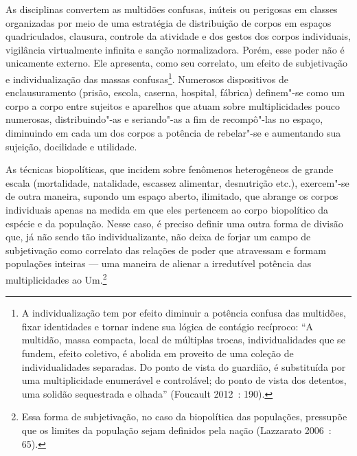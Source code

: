 As disciplinas convertem as multidões confusas, inúteis ou perigosas em
classes organizadas por meio de uma estratégia de distribuição de corpos
em espaços quadriculados, clausura, controle da atividade e dos gestos
dos corpos individuais, vigilância virtualmente infinita e sanção
normalizadora. Porém, esse poder não é unicamente externo. Ele
apresenta, como seu correlato, um efeito de subjetivação e
individualização das massas confusas\footnote{A
  individualização tem por efeito diminuir a potência confusa das
  multidões, fixar identidades e tornar indene sua lógica de contágio
  recíproco: ``A multidão, massa compacta, local de múltiplas trocas,
  individualidades que se fundem, efeito coletivo, é abolida em proveito
  de uma coleção de individualidades separadas. Do ponto de vista do
  guardião, é substituída por uma multiplicidade enumerável e
  controlável; do ponto de vista dos detentos, uma solidão sequestrada e
  olhada'' (Foucault 2012~: 190).}. Numerosos dispositivos de
enclausuramento (prisão, escola, caserna, hospital, fábrica) definem"-se
como um corpo a corpo entre sujeitos e aparelhos que atuam sobre
multiplicidades pouco numerosas, distribuindo"-as e seriando"-as a fim de
recompô"-las no espaço, diminuindo em cada um dos corpos a potência de
rebelar"-se e aumentando sua sujeição, docilidade e utilidade.

As técnicas biopolíticas, que incidem sobre fenômenos heterogêneos de
grande escala (mortalidade, natalidade, escassez alimentar, desnutrição
etc.), exercem"-se de outra maneira, supondo um espaço aberto, ilimitado,
que abrange os corpos individuais apenas na medida em que eles pertencem
ao corpo biopolítico da espécie e da população. Nesse caso, é preciso
definir uma outra forma de divisão que, já não sendo tão
individualizante, não deixa de forjar um campo de subjetivação como
correlato das relações de poder que atravessam e formam populações
inteiras --- uma maneira de alienar a irredutível potência das
multiplicidades ao Um.\footnote{Essa forma de
  subjetivação, no caso da biopolítica das populações, pressupõe que os
  limites da população sejam definidos pela nação (Lazzarato 2006~: 65).}

